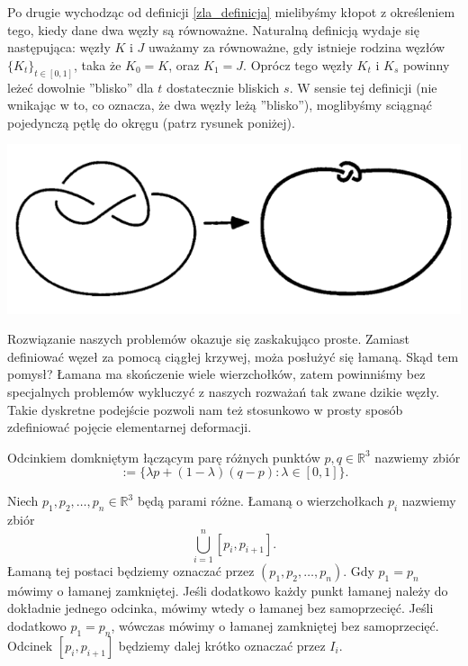 Po drugie wychodząc od definicji \ref{zla_definicja} mielibyśmy kłopot z określeniem tego, kiedy dane dwa węzły są równoważne. Naturalną definicją wydaje się
następująca: węzły $K$ i $J$ uważamy za równoważne, gdy istnieje rodzina węzłów $\lbrace K_t\rbrace_{t\in[0,1]}$, taka że $K_0 = K$, oraz $K_1 = J$. Oprócz tego 
węzły $K_t$ i $K_s$ powinny leżeć dowolnie ''blisko'' dla $t$ dostatecznie bliskich $s$. W sensie tej definicji (nie wnikając w to, co oznacza,
że dwa węzły leżą ''blisko''), moglibyśmy sciągnąć pojedynczą pętlę do okręgu (patrz rysunek poniżej). 


	\begin{center}
	
	\includegraphics[scale=0.6]{1/pictures/loop.png} 
	\end{center}


Rozwiązanie naszych problemów okazuje się zaskakująco proste. Zamiast definiować węzeł za pomocą ciągłej krzywej, moża posłużyć się łamaną. Skąd tem pomysł? Łamana ma skończenie wiele
wierzchołków, zatem powinniśmy bez specjalnych problemów wykluczyć z naszych rozważań tak zwane dzikie węzły. Takie dyskretne podejście pozwoli nam też stosunkowo w prosty sposób zdefiniować
pojęcie elementarnej deformacji.



\begin{definicja}
 Odcinkiem domkniętym łączącym parę różnych punktów $p,q\in\mathbb{R}^3$ nazwiemy zbiór 
 \begin{displaymath}
  [p,q] := \lbrace \lambda p + (1-\lambda)(q-p): \lambda\in[0,1]\rbrace.
 \end{displaymath}
\end{definicja}

\begin{definicja}
 Niech $p_1, p_2, \ldots, p_n\in\mathbb{R}^3$ będą parami różne. Łamaną o wierzchołkach $p_i$ nazwiemy zbiór 
 \begin{displaymath}
  \bigcup_{i=1}^n [p_i, p_{i+1}].
 \end{displaymath}
 Łamaną tej postaci będziemy oznaczać przez $(p_1, p_2, \ldots, p_n)$. Gdy $p_1 = p_n$ mówimy o łamanej zamkniętej.
 Jeśli dodatkowo każdy punkt łamanej należy do dokładnie jednego odcinka, mówimy wtedy o łamanej bez samoprzecięć. Jeśli dodatkowo $p_1 = p_n$, wówczas mówimy o łamanej
 zamkniętej bez samoprzecięć. Odcinek $[p_i, p_{i+1}]$ będziemy dalej krótko oznaczać przez $I_i$.
\end{definicja}

